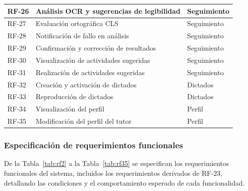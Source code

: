 \begin{longtable}{|p{1.1cm}|p{9.2cm}|p{4.1cm}|}
RF-26 & Análisis OCR y sugerencias de legibilidad & Seguimiento \\ \hline
RF-27 & Evaluación ortográfica CLS & Seguimiento \\ \hline
RF-28 & Notificación de fallo en análisis & Seguimiento \\ \hline
RF-29 & Confirmación y corrección de resultados & Seguimiento \\ \hline
RF-30 & Visualización de actividades sugeridas & Seguimiento \\ \hline
RF-31 & Realización de actividades sugeridas & Seguimiento \\ \hline
RF-32 & Creación y activación de dictados & Dictados \\ \hline
RF-33 & Reproducción de dictados & Dictados \\ \hline
RF-34 & Visualización del perfil & Perfil \\ \hline
RF-35 & Modificación del perfil del tutor & Perfil \\ \hline
\end{longtable}

\subsubsection{Especificación de requerimientos funcionales}

De la Tabla~\ref{tab:rf2} a la Tabla~\ref{tab:rf35} se especifican los requerimientos funcionales del sistema, incluidos los requerimientos derivados de RF-23, detallando las condiciones y el comportamiento esperado de cada funcionalidad.

